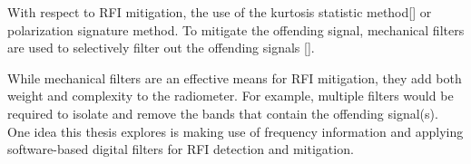 With respect to RFI mitigation, the use of the kurtosis statistic method[\cite{DeRoo}] or polarization signature method.  To mitigate the offending signal, mechanical filters are used to selectively filter out the offending signals [\cite{DeRooRFI}].  

While mechanical filters are an effective means for RFI mitigation, they add both weight and complexity to the radiometer.  For example, multiple filters would be required to isolate and remove the bands that contain the offending signal(s).  One idea this thesis explores is making use of frequency information and applying software-based digital filters for RFI detection and mitigation.







